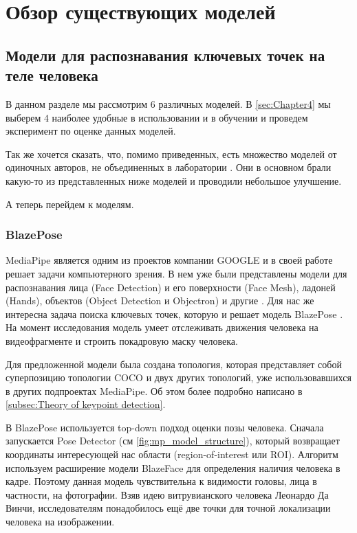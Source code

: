\section{Обзор существующих моделей}
\label{sec:Chapter2} 

\subsection{Модели для распознавания ключевых точек на теле человека}
\label{subsec:pose_estimation_models}

В данном разделе мы рассмотрим 6 различных моделей. В \autoref{sec:Chapter4} мы выберем 4 наиболее удобные в использовании и в обучении и проведем эксперимент по оценке данных моделей.

Так же хочется сказать, что, помимо приведенных, есть множество моделей от одиночных авторов, не объединенных в лаборатории \cite{pet_recognition, pet_classification}. Они в основном брали какую-то из представленных ниже моделей и проводили небольшое улучшение.

А теперь перейдем к моделям.

\subsubsection{BlazePose}
\label{subsubsec:blazepose_desc}

MediaPipe является одним из проектов компании GOOGLE и в своей работе решает задачи компьютерного зрения. В нем уже были представлены модели для распознавания лица (Face Detection) и его поверхности (Face Mesh), ладоней (Hands), объектов (Object Detection и Objectron) и другие \cite{mediapipe}. Для нас же интересна задача поиска ключевых точек, которую и решает модель BlazePose \cite{BlazePose}. На момент исследования модель умеет отслеживать движения человека на видеофрагменте и строить покадровую маску человека.

Для предложенной модели была создана топология, которая представляет собой суперпозицию топологии COCO и двух других топологий, уже использовавшихся в других подпроектах MediaPipe. Об этом более подробно написано в \autoref{subsec:Theory of keypoint detection}.

\hfill \break
В BlazePose используется top-down подход оценки позы человека. Сначала запускается Pose Detector (см \autoref{fig:mp_model_structure}), который возвращает координаты интересующей нас области (region-of-interest или ROI). Алгоритм используем расширение модели BlazeFace для определения наличия человека в кадре. Поэтому данная модель чувствительна к видимости головы, лица в частности, на фотографии. Взяв идею витрувианского человека Леонардо Да Винчи, исследователям понадобилось ещё две точки для точной локализации человека на изображении.

